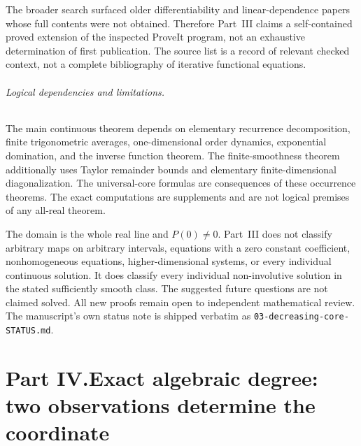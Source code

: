 \documentclass[11pt,letterpaper]{article}
\theoremstyle{definition}
\theoremstyle{remark}
\begin{document}
The broader search surfaced older differentiability and linear-dependence
papers whose full contents were not obtained. Therefore Part~III
claims a self-contained proved extension of the inspected ProveIt
program, not an exhaustive determination of first publication.
The source list is a record of relevant checked context, not a complete
bibliography of iterative functional equations.

\paragraph{Logical dependencies and limitations.}
The main continuous theorem depends on elementary recurrence
decomposition, finite trigonometric averages, one-dimensional order
dynamics, exponential domination, and the inverse function theorem.
The finite-smoothness theorem additionally uses Taylor remainder bounds
and elementary finite-dimensional diagonalization. The universal-core
formulas are consequences of these occurrence theorems. The exact
computations are supplements and are not logical premises of any
all-real theorem.

The domain is the whole real line and $P(0)\ne0$. Part~III does not
classify arbitrary maps on arbitrary intervals, equations with a zero
constant coefficient, nonhomogeneous equations, higher-dimensional
systems, or every individual continuous solution. It does classify
every individual non-involutive solution in the stated sufficiently
smooth class. The suggested future questions are not claimed solved.
All new proofs remain open to independent mathematical review.
The manuscript's own status note is shipped verbatim as
\nolinkurl{03-decreasing-core-STATUS.md}.


\clearpage
{}\part*{Part IV.\quad Exact algebraic degree: two observations determine the coordinate}
\end{document}
